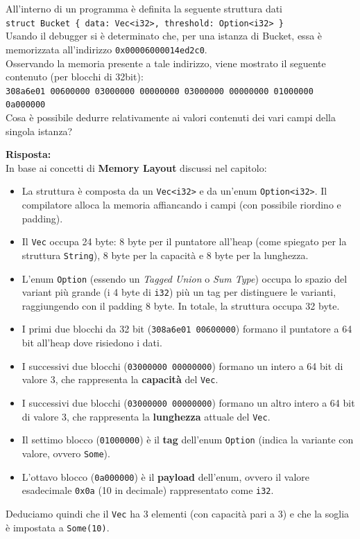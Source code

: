\begin{exambox}[Domanda 1]
All'interno di un programma è definita la seguente struttura dati\\
\texttt{struct Bucket \{ data: Vec<i32>, threshold: Option<i32> \}}\\
Usando il debugger si è determinato che, per una istanza di Bucket, essa è memorizzata all'indirizzo \texttt{0x00006000014ed2c0}.\\
Osservando la memoria presente a tale indirizzo, viene mostrato il seguente contenuto (per blocchi di 32bit):\\
\texttt{308a6e01 00600000 03000000 00000000 03000000 00000000 01000000 0a000000}\\
Cosa è possibile dedurre relativamente ai valori contenuti dei vari campi della singola istanza?

\textbf{Risposta:} \\
In base ai concetti di \textbf{Memory Layout} discussi nel capitolo:
\begin{itemize}
    \item La struttura è composta da un \texttt{Vec<i32>} e da un'enum \texttt{Option<i32>}. Il compilatore alloca la memoria affiancando i campi (con possibile riordino e padding).
    \item Il \texttt{Vec} occupa 24 byte: 8 byte per il puntatore all'heap (come spiegato per la struttura \texttt{String}), 8 byte per la capacità e 8 byte per la lunghezza.
    \item L'enum \texttt{Option} (essendo un \textit{Tagged Union} o \textit{Sum Type}) occupa lo spazio del variant più grande (i 4 byte di \texttt{i32}) più un tag per distinguere le varianti, raggiungendo con il padding 8 byte. In totale, la struttura occupa 32 byte.
    \item I primi due blocchi da 32 bit (\texttt{308a6e01 00600000}) formano il puntatore a 64 bit all'heap dove risiedono i dati.
    \item I successivi due blocchi (\texttt{03000000 00000000}) formano un intero a 64 bit di valore 3, che rappresenta la \textbf{capacità} del \texttt{Vec}.
    \item I successivi due blocchi (\texttt{03000000 00000000}) formano un altro intero a 64 bit di valore 3, che rappresenta la \textbf{lunghezza} attuale del \texttt{Vec}.
    \item Il settimo blocco (\texttt{01000000}) è il \textbf{tag} dell'enum \texttt{Option} (indica la variante con valore, ovvero \texttt{Some}).
    \item L'ottavo blocco (\texttt{0a000000}) è il \textbf{payload} dell'enum, ovvero il valore esadecimale \texttt{0x0a} (10 in decimale) rappresentato come \texttt{i32}.
\end{itemize}
Deduciamo quindi che il \texttt{Vec} ha 3 elementi (con capacità pari a 3) e che la soglia è impostata a \texttt{Some(10)}.
\end{exambox}

